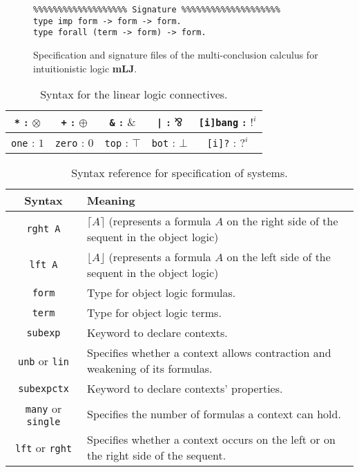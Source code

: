 \documentclass{llncs}
\begin{document}
\begin{figure}
\begin{verbatim}
%%%%%%%%%%%%%%%%%%% Signature %%%%%%%%%%%%%%%%%%%%
type imp form -> form -> form.
type forall (term -> form) -> form.
\end{verbatim}
\caption{Specification and signature files of the multi-conclusion
calculus for intuitionistic logic \textbf{mLJ}.}
\label{fig:input}
\end{figure}
%
\begin{table}
\centering
\begin{tabular}{|c|c|c|c|c|}
\hline
\texttt{*} : $\otimes$ & \texttt{+} : $\oplus$ & \texttt{\&} : $\&$ & \texttt{|} : $\bindnasrepma$ & \texttt{[i]bang} : $!^i$ \\
\hline
\texttt{one} : $1$ & \texttt{zero} : $0$ & \texttt{top} : $\top$ & \texttt{bot} : $\bot$ & \texttt{[i]?} : $?^i$ \\
\hline
\end{tabular}
\vspace{0.2cm}
\caption{Syntax for the linear logic connectives.}
\label{tbl:syntax_ll}
\end{table}
%
\begin{table}
\centering
\begin{tabular}{|c|l|}
\hline
Syntax & Meaning \\
\hline
\hline
\texttt{rght A} & $\lceil A \rceil$ (represents a formula $A$ on the right side of the sequent in the object logic)\\
\hline
\texttt{lft A} & $\lfloor A \rfloor$ (represents a formula $A$ on the left side of the sequent in the object logic)\\
\hline
\texttt{form} & Type for object logic formulas.\\
\hline
\texttt{term} & Type for object logic terms.\\
\hline
\texttt{subexp} & Keyword to declare contexts.\\
\hline
\texttt{unb} or \texttt{lin} & Specifies whether a context allows contraction and weakening of its formulas.\\
\hline
\texttt{subexpctx} & Keyword to declare contexts' properties.\\
\hline
\texttt{many} or \texttt{single} & Specifies the number of formulas a context can hold.\\
\hline
\texttt{lft} or \texttt{rght} & Specifies whether a context occurs on the left or on the right side of the sequent.\\
\hline
\end{tabular}
\vspace{0.2cm}
\caption{Syntax reference for specification of systems.}
\label{tbl:syntax}
\end{table}
\end{document}
